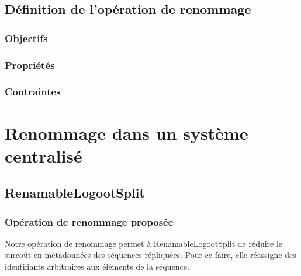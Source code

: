 \documentclass[12pt]{thesul}
\begin{document}
\section{Définition de l'opération de renommage}
\subsection{Objectifs}
\subsection{Propriétés}
\subsection{Contraintes} %

\NumberThisInToc
\chapter{Renommage dans un système centralisé}
\minitoc
\section{RenamableLogootSplit}
\subsection{Opération de renommage proposée}

Notre opération de renommage permet à RenamableLogootSplit de réduire le surcoût en métadonnées des séquences répliquées.
Pour ce faire, elle réassigne des identifiants arbitraires aux éléments de la séquence.
\end{document}
